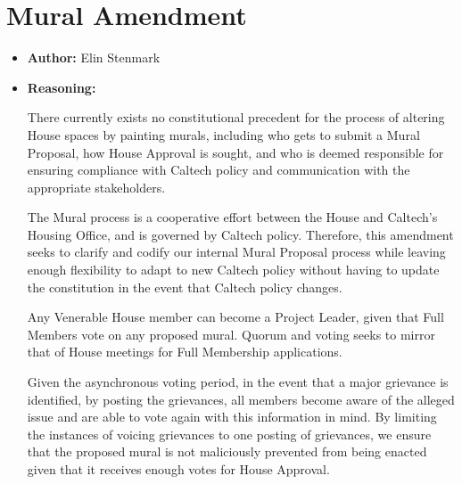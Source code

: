 \documentclass[10pt]{article} %
\begin{document}
\clearpage
\section{Mural Amendment}
\begin{itemize}
    \item \textbf{Author:} Elin Stenmark
    \item \textbf{Reasoning:}
    
    There currently exists no constitutional precedent for the process of altering House spaces by painting murals, including who gets to submit a Mural Proposal, how House Approval is sought, and who is deemed responsible for ensuring compliance with Caltech policy and communication with the appropriate stakeholders.

    The Mural process is a cooperative effort between the House and Caltech's Housing Office, and is governed by Caltech policy. Therefore, this amendment seeks to clarify and codify our internal Mural Proposal process while leaving enough flexibility to adapt to new Caltech policy without having to update the constitution in the event that Caltech policy changes.
    
    Any Venerable House member can become a Project Leader, given that Full Members vote on any proposed mural. Quorum and voting seeks to mirror that of House meetings for Full Membership applications.
    
    Given the asynchronous voting period, in the event that a major grievance is identified, by posting the grievances, all members become aware of the alleged issue and are able to vote again with this information in mind. By limiting the instances of voicing grievances to one posting of grievances, we ensure that the proposed mural is not maliciously prevented from being enacted given that it receives enough votes for House Approval. %


\end{itemize}
\end{document}
